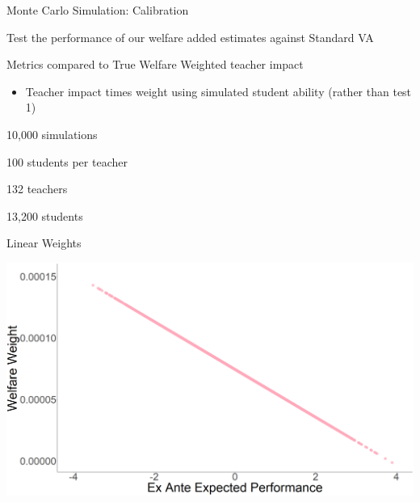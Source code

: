 \documentclass[t,aspectratio=169,11pt]{beamer}
\newenvironment{wideitemize}{\itemize\addtolength{\itemsep}{14pt}}{\enditemize}
\begin{document}
\begin{frame}{Monte Carlo Simulation: Calibration}
\begin{wideitemize}
\item Test the performance of our welfare added estimates against Standard VA
\item Metrics compared to True Welfare Weighted teacher impact
\begin{itemize}
        \item Teacher impact times weight using simulated student ability (rather than test 1)
\end{itemize}
\item 10,000 simulations 
\item 100 students per teacher 
\item 132 teachers 
\item 13,200 students
\end{wideitemize}
\end{frame}



\begin{frame}{Linear Weights} 

\centering

\includegraphics[width=.85\linewidth]{slides/Figures/linear_weight.png}

\end{frame}

\end{document}
